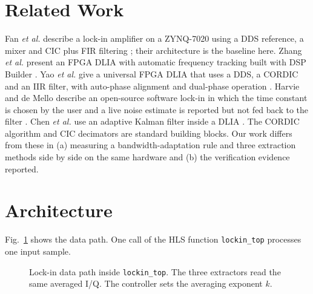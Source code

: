 \documentclass[journal]{IEEEtran}
\begin{document}
\section{Related Work}
Fan \emph{et al.} describe a lock-in amplifier on a ZYNQ-7020 using a DDS reference, a mixer and CIC plus FIR filtering \cite{fan}; their architecture is the baseline here. Zhang \emph{et al.} present an FPGA DLIA with automatic frequency tracking built with DSP Builder \cite{zhang}. Yao \emph{et al.} give a universal FPGA DLIA that uses a DDS, a CORDIC and an IIR filter, with auto-phase alignment and dual-phase operation \cite{yao}. Harvie and de Mello describe an open-source software lock-in in which the time constant is chosen by the user and a live noise estimate is reported but not fed back to the filter \cite{olia}. Chen \emph{et al.} use an adaptive Kalman filter inside a DLIA \cite{chen}. The CORDIC algorithm \cite{volder} and CIC decimators \cite{hogenauer} are standard building blocks. Our work differs from these in (a) measuring a bandwidth-adaptation rule and three extraction methods side by side on the same hardware and (b) the verification evidence reported.

\section{Architecture}
Fig.~\ref{fig:arch} shows the data path. One call of the HLS function \texttt{lockin\_top} processes one input sample.
\begin{figure}[t]
\centering
{}
\caption{Lock-in data path inside \texttt{lockin\_top}. The three extractors read the same averaged I/Q. The controller sets the averaging exponent $k$.}
\label{fig:arch}
\end{figure}
\end{document}
